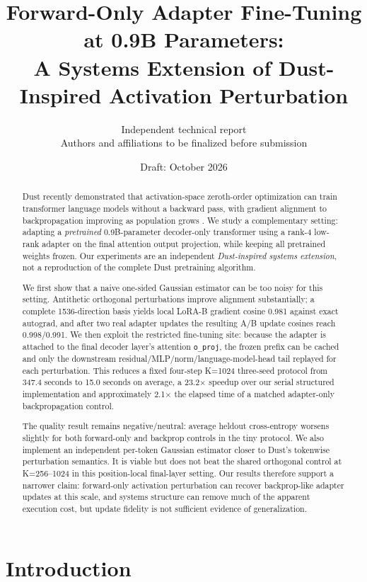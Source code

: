 \documentclass[11pt]{article}
\title{Forward-Only Adapter Fine-Tuning at 0.9B Parameters:\\
A Systems Extension of Dust-Inspired Activation Perturbation}
\author{Independent technical report\\
Authors and affiliations to be finalized before submission}
\date{Draft: October 2026}
\newcommand{\oproj}{\texttt{o\_proj}}
\begin{document}
\maketitle

\begin{abstract}
Dust recently demonstrated that activation-space zeroth-order optimization can
train transformer language models without a backward pass, with gradient
alignment to backpropagation improving as population grows
\citep{dahal2026dust}. We study a complementary setting: adapting a
\emph{pretrained} 0.9B-parameter decoder-only transformer using a rank-4
low-rank adapter on the final attention output projection, while keeping all
pretrained weights frozen. Our experiments are an independent
\emph{Dust-inspired systems extension}, not a reproduction of the complete
Dust pretraining algorithm.

We first show that a naive one-sided Gaussian estimator can be too noisy for
this setting. Antithetic orthogonal perturbations improve alignment
substantially; a complete 1536-direction basis yields local LoRA-B gradient
cosine 0.981 against exact autograd, and after two real adapter updates the
resulting A/B update cosines reach 0.998/0.991. We then exploit the restricted
fine-tuning site: because the adapter is attached to the final decoder
layer's attention \oproj{}, the frozen prefix can be cached and only the
downstream residual/MLP/norm/language-model-head tail replayed for each
perturbation. This reduces a fixed four-step K=1024 three-seed protocol from
347.4 seconds to 15.0 seconds on average, a 23.2$\times$ speedup over our
serial structured implementation and approximately 2.1$\times$ the elapsed
time of a matched adapter-only backpropagation control.

The quality result remains negative/neutral: average heldout cross-entropy
worsens slightly for both forward-only and backprop controls in the tiny
protocol. We also implement an independent per-token Gaussian estimator closer
to Dust's tokenwise perturbation semantics. It is viable but does not beat the
shared orthogonal control at K=256--1024 in this position-local final-layer
setting. Our results therefore support a narrower claim: forward-only
activation perturbation can recover backprop-like adapter updates at this
scale, and systems structure can remove much of the apparent execution cost,
but update fidelity is not sufficient evidence of generalization.
\end{abstract}

\section{Introduction}
\end{document}
